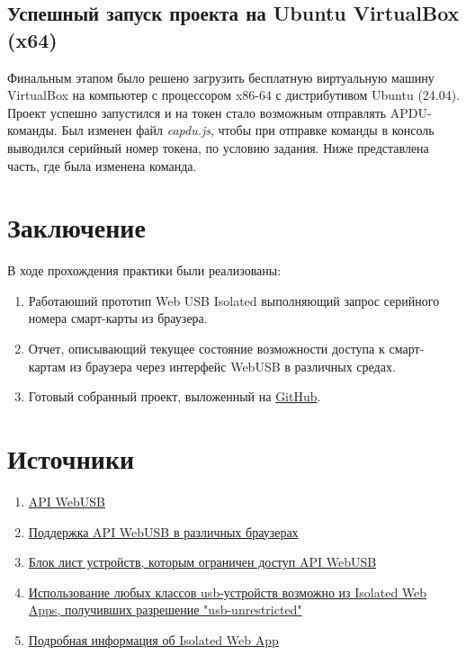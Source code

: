 \documentclass[12pt]{article}
\begin{document}
\subsection{Успешный запуск проекта на Ubuntu VirtualBox (x64)}
Финальным этапом было решено загрузить бесплатную виртуальную машину VirtualBox на компьютер с процессором x86-64 с дистрибутивом Ubuntu (24.04). \\
Проект успешно запустился и на токен стало возможным отправлять APDU-команды. Был изменен файл \emph{capdu.js}, чтобы при отправке команды в консоль выводился серийный номер токена, по условию задания. Ниже представлена часть, где была изменена команда.  


\section{Заключение}
В ходе прохождения практики были реализованы: 
\begin{enumerate}
    \item Работаюший прототип Web USB Isolated выполняющий запрос серийного номера смарт-карты из браузера. 
    \item Отчет, описывающий текущее состояние возможности доступа к смарт-картам из браузера через интерфейс WebUSB в различных средах. 
    \item Готовый собранный проект, выложенный на \href{https://github.com/rdnv001/WebUSB_Isolated}{{GitHub}}. 
\end{enumerate}

\section{Источники}
\begin{enumerate}
    \item \href{https://developer.mozilla.org/en-US/docs/Web/API/WebUSB_API}{{API WebUSB}}
    \item \href{https://caniuse.com/webusb}{{Поддержка API WebUSB в различных браузерах}}
    \item \href{https://groups.google.com/a/chromium.org/g/blink-dev/c/LZXocaeCwDw/m/GLfAffGLAAAJ?pli=1}{{Блок лист устройств, которым ограничен доступ API WebUSB}}
    \item \href{https://github.com/WICG/webusb/blob/main/unrestricted-usb-explainer.md}{{Использование любых классов usb-устройств возможно из Isolated Web Apps, получивших разрешение "usb-unrestricted"}}
    \item \href{https://github.com/WICG/isolated-web-apps/tree/main}{{Подробная информация об Isolated Web App}}
\end{enumerate}
\end{document}
